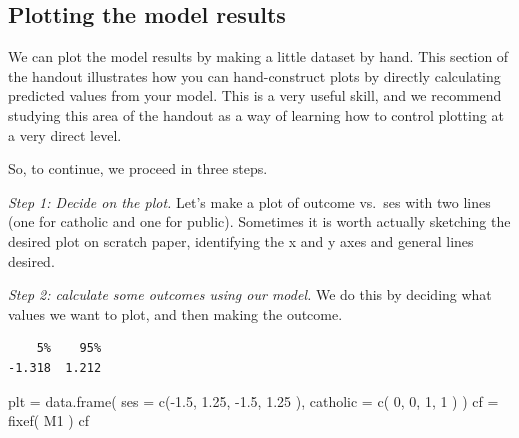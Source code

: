 \documentclass[
  letterpaper,
  DIV=11,
  numbers=noendperiod]{scrreprt}
\newenvironment{Shaded}{\begin{snugshade}}{\end{snugshade}}
\newcommand{\AttributeTok}[1]{\textcolor[rgb]{0.49,0.56,0.16}{#1}}
\newcommand{\DecValTok}[1]{\textcolor[rgb]{0.25,0.63,0.44}{#1}}
\newcommand{\FloatTok}[1]{\textcolor[rgb]{0.25,0.63,0.44}{#1}}
\newcommand{\FunctionTok}[1]{\textcolor[rgb]{0.02,0.16,0.49}{#1}}
\newcommand{\NormalTok}[1]{\textcolor[rgb]{0.00,0.44,0.13}{#1}}
\newcommand{\OtherTok}[1]{\textcolor[rgb]{0.00,0.44,0.13}{#1}}
\newcommand{\SpecialCharTok}[1]{\textcolor[rgb]{0.25,0.44,0.63}{#1}}
\begin{document}
\hypertarget{plotting-the-model-results}{%
\subsection{Plotting the model
results}\label{plotting-the-model-results}}

We can plot the model results by making a little dataset by hand. This
section of the handout illustrates how you can hand-construct plots by
directly calculating predicted values from your model. This is a very
useful skill, and we recommend studying this area of the handout as a
way of learning how to control plotting at a very direct level.

So, to continue, we proceed in three steps.

\emph{Step 1: Decide on the plot.} Let's make a plot of outcome vs.~ses
with two lines (one for catholic and one for public). Sometimes it is
worth actually sketching the desired plot on scratch paper, identifying
the x and y axes and general lines desired.

\emph{Step 2: calculate some outcomes using our model.} We do this by
deciding what values we want to plot, and then making the outcome.

\begin{Shaded}
\end{Shaded}

\begin{verbatim}
    5%    95% 
-1.318  1.212 
\end{verbatim}

\begin{Shaded}
\begin{Highlighting}[]
\NormalTok{plt }\OtherTok{=} \FunctionTok{data.frame}\NormalTok{( }\AttributeTok{ses =} \FunctionTok{c}\NormalTok{(}\SpecialCharTok{{-}}\FloatTok{1.5}\NormalTok{, }\FloatTok{1.25}\NormalTok{, }\SpecialCharTok{{-}}\FloatTok{1.5}\NormalTok{, }\FloatTok{1.25}\NormalTok{ ),}
                  \AttributeTok{catholic =} \FunctionTok{c}\NormalTok{( }\DecValTok{0}\NormalTok{, }\DecValTok{0}\NormalTok{, }\DecValTok{1}\NormalTok{, }\DecValTok{1}\NormalTok{ ) )}
\NormalTok{cf }\OtherTok{=} \FunctionTok{fixef}\NormalTok{( M1 )}
\NormalTok{cf}
\end{Highlighting}
\end{Shaded}
\end{document}
